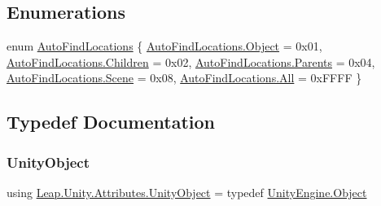 \subsection*{Enumerations}
\begin{DoxyCompactItemize}
\item 
enum \mbox{\hyperlink{namespace_leap_1_1_unity_1_1_attributes_a4b8f0ac9a7b74b480178dc5fb4069a89}{Auto\+Find\+Locations}} \{ \newline
\mbox{\hyperlink{namespace_leap_1_1_unity_1_1_attributes_a4b8f0ac9a7b74b480178dc5fb4069a89a497031794414a552435f90151ac3b54b}{Auto\+Find\+Locations.\+Object}} = 0x01, 
\mbox{\hyperlink{namespace_leap_1_1_unity_1_1_attributes_a4b8f0ac9a7b74b480178dc5fb4069a89a64e4aca4297806247f62a7b5f8cbd3df}{Auto\+Find\+Locations.\+Children}} = 0x02, 
\mbox{\hyperlink{namespace_leap_1_1_unity_1_1_attributes_a4b8f0ac9a7b74b480178dc5fb4069a89a9dafe3747e06aa15af0bfba521f66346}{Auto\+Find\+Locations.\+Parents}} = 0x04, 
\mbox{\hyperlink{namespace_leap_1_1_unity_1_1_attributes_a4b8f0ac9a7b74b480178dc5fb4069a89a9ead0d38e06ec253ca0ecbf6ea56e59b}{Auto\+Find\+Locations.\+Scene}} = 0x08, 
\newline
\mbox{\hyperlink{namespace_leap_1_1_unity_1_1_attributes_a4b8f0ac9a7b74b480178dc5fb4069a89ab1c94ca2fbc3e78fc30069c8d0f01680}{Auto\+Find\+Locations.\+All}} = 0x\+F\+F\+FF
 \}
\end{DoxyCompactItemize}


\subsection{Typedef Documentation}
\mbox{\label{namespace_leap_1_1_unity_1_1_attributes_a71d15e38cb19d7d2ffb1aa310ce8f0f9}} 
\subsubsection{\texorpdfstring{UnityObject}{UnityObject}}
{\footnotesize\ttfamily using \mbox{\hyperlink{namespace_leap_1_1_unity_1_1_attributes_a71d15e38cb19d7d2ffb1aa310ce8f0f9}{Leap.\+Unity.\+Attributes.\+Unity\+Object}} = typedef \mbox{\hyperlink{namespace_leap_1_1_unity_1_1_attributes_a4b8f0ac9a7b74b480178dc5fb4069a89a497031794414a552435f90151ac3b54b}{Unity\+Engine.\+Object}}}



